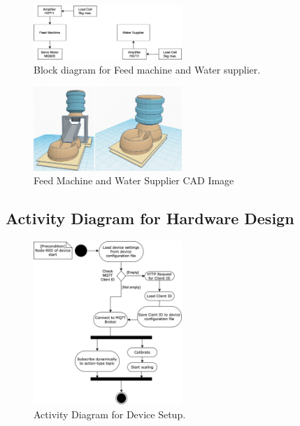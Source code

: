 \documentclass[conference]{IEEEtran}
\begin{document}
\begin{figure}[htbp]
\centerline{\includegraphics[width=0.5\textwidth]{./images/hardwareBlock.png}}
\caption{Block diagram for Feed machine and Water supplier.}
\label{fig}
\end{figure}

\begin{figure}[htbp]
\centerline{\includegraphics[width=0.5\textwidth]{./images/Feed Machine & Water Supplier.jpg}}
\caption{Feed Machine and Water Supplier CAD Image}
\label{fig}
\end{figure}



\subsection{Activity Diagram for Hardware Design}

\begin{figure}[htbp]
\centerline{\includegraphics[width=0.5\textwidth]{./images/deviceSetup.png}}
\caption{Activity Diagram for Device Setup.}
\label{fig}
\end{figure}
\end{document}
